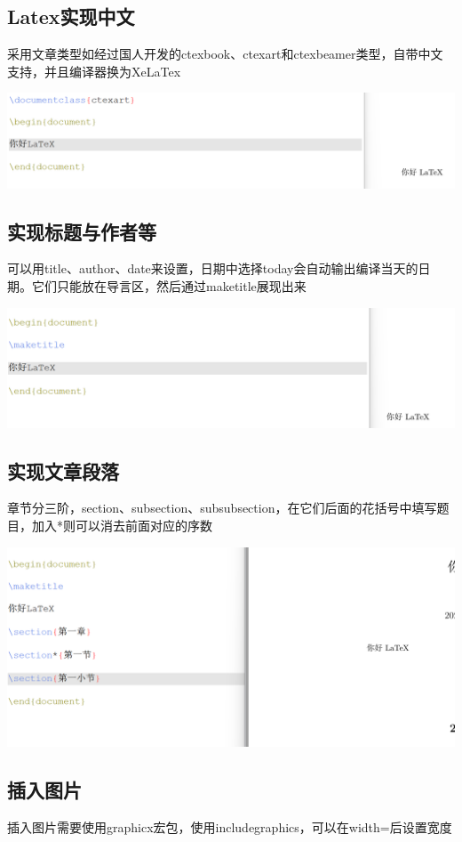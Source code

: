 \documentclass[UTF8,a4paper]{ctexart}
\begin{document}
\begin{sloppypar}
	\subsection{Latex实现中文}
	采用文章类型如经过国人开发的ctexbook、ctexart和ctexbeamer类型，自带中文支持，并且编译器换为XeLaTex
	
	\includegraphics[width = 16cm]{13}
	
	\subsection{实现标题与作者等}
	可以用title、author、date来设置，日期中选择today会自动输出编译当天的日期。它们只能放在导言区，然后通过maketitle展现出来
	
	\includegraphics[width = 16cm]{14}
	
	\subsection{实现文章段落}
	章节分三阶，section、subsection、subsubsection，在它们后面的花括号中填写题目，加入*则可以消去前面对应的序数
	
	\includegraphics[width = 16cm]{15}
	
	\subsection{插入图片}
	插入图片需要使用graphicx宏包，使用includegraphics，可以在width=后设置宽度
	

\end{sloppypar}
\end{document}
